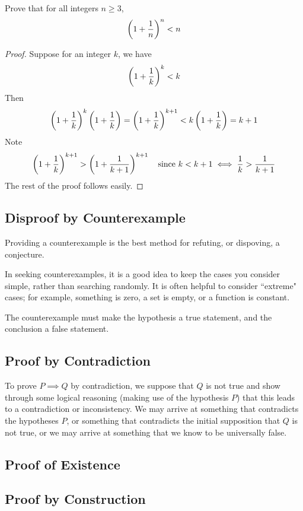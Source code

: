 \begin{prbm}
Prove that for all integers $n \ge 3$, 
\[ \left(1+\frac{1}{n}\right)^n<n \]
\end{prbm}

\begin{proof}
Suppose for an integer $k$, we have 
\[ \left(1+\frac{1}{k}\right)^k<k \]
Then
\[ \left(1+\frac{1}{k}\right)^k\left(1+\frac{1}{k}\right) = \left(1+\frac{1}{k}\right)^{k+1}<k\left(1+\frac{1}{k}\right) = k+1  \]
Note 
\[ \left(1+\frac{1}{k}\right)^{k+1} > \left(1+\frac{1}{k+1}\right)^{k+1} \quad \text{since } k<k+1 \iff \frac{1}{k}>\frac{1}{k+1} \]
The rest of the proof follows easily.
\end{proof}

\subsection{Disproof by Counterexample}
Providing a counterexample is the best method for refuting, or dispoving, a conjecture. 

In seeking counterexamples, it is a good idea to keep the cases you consider simple, rather than searching randomly. It is often helpful to consider ``extreme" cases; for example, something is zero, a set is empty, or a function is constant.

The counterexample must make the hypothesis a true statement, and the conclusion a false statement.

\subsection{Proof by Contradiction}
To prove $P \implies Q$ by contradiction, we suppose that $Q$ is not true and show through some logical reasoning (making use of the hypothesis $P$) that this leads to a contradiction or inconsistency. We may arrive at something that contradicts the hypotheses $P$, or something that contradicts the initial supposition that $Q$ is not true, or we may arrive at something that we know to be universally false.

\subsection{Proof of Existence}
\subsection{Proof by Construction}

